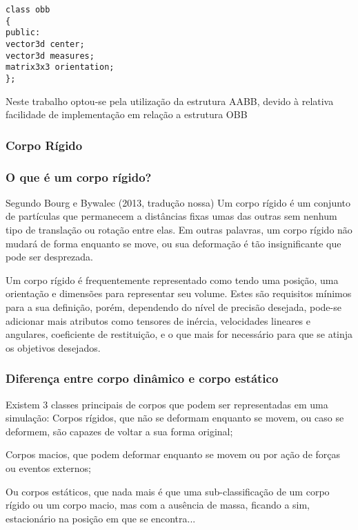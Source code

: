 \begin{lstlisting}[frame=single,caption=Código de exemplo de OBB\label{code:obb_1}]
class obb
{
public:
vector3d center;
vector3d measures;
matrix3x3 orientation;
};
\end{lstlisting}

Neste trabalho optou-se pela utilização da estrutura AABB, devido à relativa facilidade de implementação em relação a estrutura OBB

\subsubsection{ Corpo Rígido}
\subsubsection{ O que é um corpo rígido?}

Segundo Bourg e Bywalec (2013, tradução nossa) Um corpo rígido é um conjunto de partículas  que permanecem a distâncias fixas umas das outras  sem nenhum tipo de translação ou rotação entre elas. Em outras palavras,  um corpo rígido não mudará de forma enquanto se move, ou sua deformação é tão insignificante que pode ser desprezada.

Um corpo rígido é  frequentemente representado como tendo uma posição, uma orientação  e  dimensões para representar seu volume. Estes são requisitos mínimos para a  sua definição, porém, dependendo do nível de precisão desejada, pode-se adicionar mais atributos como tensores de inércia, velocidades lineares e angulares, coeficiente de restituição, e o que mais for necessário para que se atinja os objetivos desejados.

\subsubsection{ Diferença entre corpo dinâmico e corpo estático}

Existem 3 classes principais de corpos que podem ser representadas em uma simulação:
Corpos rígidos, que não se deformam  enquanto se movem, ou caso se deformem, são capazes de voltar a sua forma original;


Corpos macios, que podem deformar enquanto se movem ou por ação de forças ou eventos externos;

Ou corpos estáticos, que nada mais é que uma sub-classificação de um corpo rígido ou um corpo macio,  mas com a ausência de massa, ficando a sim, estacionário na posição em que se
encontra...

